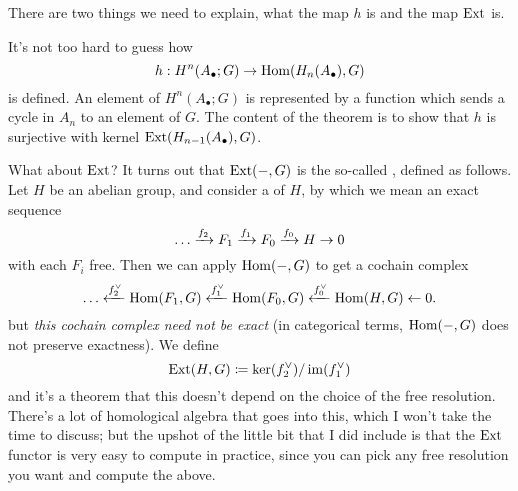 There are two things we need to explain, what the map $h$ is and the map $\operatorname{Ext}$ is.

It's not too hard to guess how \[ h : H^n(A_\bullet; G) \to \operatorname{Hom}(H_n(A_\bullet), G) \] is defined.
An element of $H^n(A_\bullet;G)$ is represented by a function which sends a cycle
in $A_n$ to an element of $G$.
The content of the theorem is to show that $h$ is surjective with kernel $\operatorname{Ext}(H_{n-1}(A_\bullet), G)$.

What about $\operatorname{Ext}$?
It turns out that $\operatorname{Ext}(-,G)$ is the so-called , defined as follows.
Let $H$ be an abelian group, and consider a  of $H$,
by which we mean an exact sequence
\[ \dots \xrightarrow{f_2} F_1 \xrightarrow{f_1} F_0 \xrightarrow{f_0} H \to 0 \]
with each $F_i$ free.
Then we can apply $\operatorname{Hom}(-,G)$ to get a cochain complex
\[ \dots \xleftarrow{f_2^\vee} \operatorname{Hom}(F_1, G) \xleftarrow{f_1^\vee}
	\operatorname{Hom}(F_0, G) \xleftarrow{f_0^\vee} \operatorname{Hom}(H,G) \leftarrow 0. \]
but \emph{this cochain complex need not be exact}
(in categorical terms, $\operatorname{Hom}(-,G)$ does not preserve exactness).
We define \[ \operatorname{Ext}(H,G) \coloneqq \ker(f_2^\vee) / \operatorname{im}(f_1^\vee) \]
and it's a theorem that this doesn't depend on the choice of the free resolution.
There's a lot of homological algebra that goes into this,
which I won't take the time to discuss;
but the upshot of the little bit that I did include is that the $\operatorname{Ext}$
functor is very easy to compute in practice, since
you can pick any free resolution you want and compute the above.



